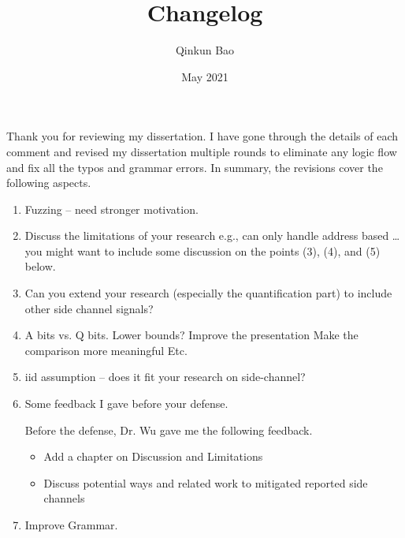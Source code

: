 \documentclass{article}
\title{Changelog}
\author{Qinkun Bao}
\date{May 2021}
\begin{document}
\maketitle
Thank you for reviewing my dissertation. I have gone through the details of each comment and revised my dissertation multiple rounds to eliminate any logic flow and fix all the typos and grammar errors. In summary, the revisions cover the following aspects.


\begin{enumerate}
\item Fuzzing – need stronger motivation.
\item Discuss the limitations of your research
e.g., can only handle address based …
you might want to include some discussion on the points (3), (4), and (5) below.
\item Can you extend your research (especially the quantification part) to include other side channel signals?
\item A bits vs. Q bits. Lower bounds?
       Improve the presentation
       Make the comparison more meaningful
       Etc.
\item iid assumption – does it fit your research on side-channel?
\item Some feedback I gave before your defense.

Before the defense, Dr. Wu gave me the following feedback.
\begin{itemize}
\item Add a chapter on Discussion and Limitations
\item Discuss potential ways and related work to mitigated reported side channels
\end{itemize}

\item Improve Grammar.
\end{enumerate}
\end{document}
